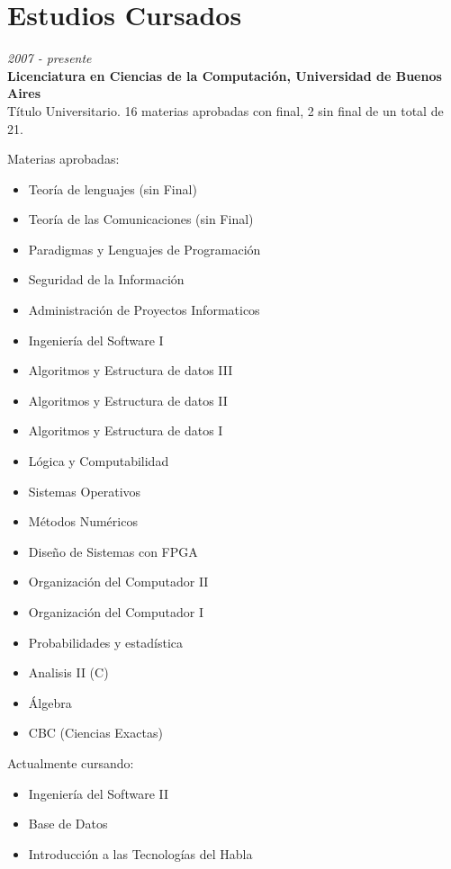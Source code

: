 \section{Estudios Cursados}

\begin{large}\textit{2007 - presente}\\
	   \textbf{Licenciatura en Ciencias de la Computación, Universidad de Buenos Aires}\\
	  Título Universitario. 16 materias aprobadas con final, 2 sin final de un total de 21.\\
\end{large}
Materias aprobadas:
\begin{multicols}{2}
\begin{itemize}
    \item Teoría de lenguajes (sin Final)
    \item Teoría de las Comunicaciones (sin Final)
    \item Paradigmas y Lenguajes de Programación
    \item Seguridad de la Información
    \item Administración de Proyectos Informaticos
    \item Ingeniería del Software I
    \item Algoritmos y Estructura de datos III
    \item Algoritmos y Estructura de datos II
    \item Algoritmos y Estructura de datos I
    \item Lógica y Computabilidad
    \item Sistemas Operativos
    \item Métodos Numéricos
    \item Diseño de Sistemas con FPGA
    \item Organización del Computador II
    \item Organización del Computador I
    \item Probabilidades y estadística
    \item Analisis II (C)
    \item Álgebra
    \item CBC (Ciencias Exactas)
\end{itemize}
\end{multicols}

\noindent Actualmente cursando:
\begin{multicols}{2}
\begin{itemize}
    \item Ingeniería del Software II
    \item Base de Datos
    \item Introducción a las Tecnologías del Habla
\end{itemize}	 
\end{multicols}


